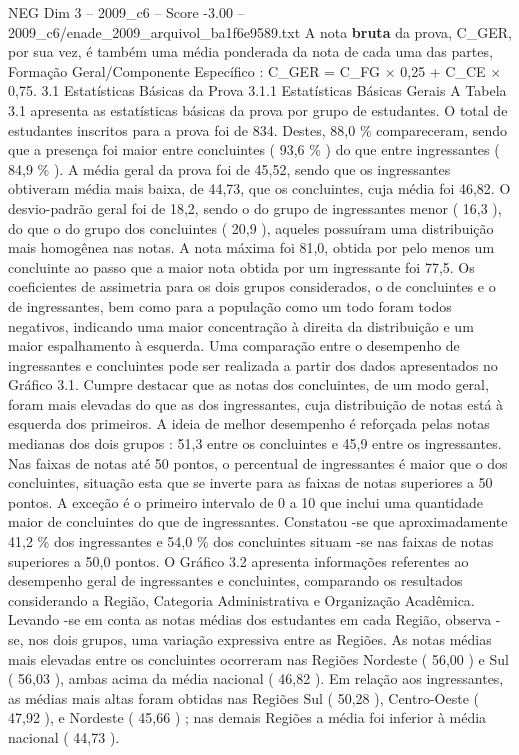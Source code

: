 \begin{textsample}{NEG Dim 3 – 2009\_c6 – Score -3.00 – 2009\_c6/enade\_2009\_arquivol\_ba1f6e9589.txt}
A nota \textbf{bruta} da prova, C\_GER, por sua vez, é também uma média ponderada da nota de cada uma das partes, Formação Geral/Componente Específico : C\_GER = C\_FG × 0,25 + C\_CE × 0,75. 3.1 Estatísticas Básicas da Prova 3.1.1 Estatísticas Básicas Gerais A Tabela 3.1 apresenta as estatísticas básicas da prova por grupo de estudantes.
O total de estudantes inscritos para a prova foi de 834.
Destes, 88,0 \% compareceram, sendo que a presença foi maior entre concluintes ( 93,6 \% ) do que entre ingressantes ( 84,9 \% ).
A média geral da prova foi de 45,52, sendo que os ingressantes obtiveram média mais baixa, de 44,73, que os concluintes, cuja média foi 46,82.
O desvio-padrão geral foi de 18,2, sendo o do grupo de ingressantes menor ( 16,3 ), do que o do grupo dos concluintes ( 20,9 ), aqueles possuíram uma distribuição mais homogênea nas notas.
A nota máxima foi 81,0, obtida por pelo menos um concluinte ao passo que a maior nota obtida por um ingressante foi 77,5.
Os coeficientes de assimetria para os dois grupos considerados, o de concluintes e o de ingressantes, bem como para a população como um todo foram todos negativos, indicando uma maior concentração à direita da distribuição e um maior espalhamento à esquerda.
Uma comparação entre o desempenho de ingressantes e concluintes pode ser realizada a partir dos dados apresentados no Gráfico 3.1.
Cumpre destacar que as notas dos concluintes, de um modo geral, foram mais elevadas do que as dos ingressantes, cuja distribuição de notas está à esquerda dos primeiros.
A ideia de melhor desempenho é reforçada pelas notas medianas dos dois grupos : 51,3 entre os concluintes e 45,9 entre os ingressantes.
Nas faixas de notas até 50 pontos, o percentual de ingressantes é maior que o dos concluintes, situação esta que se inverte para as faixas de notas superiores a 50 pontos.
A exceção é o primeiro intervalo de 0 a 10 que inclui uma quantidade maior de concluintes do que de ingressantes.
Constatou -se que aproximadamente 41,2 \% dos ingressantes e 54,0 \% dos concluintes situam -se nas faixas de notas superiores a 50,0 pontos.
O Gráfico 3.2 apresenta informações referentes ao desempenho geral de ingressantes e concluintes, comparando os resultados considerando a Região, Categoria Administrativa e Organização Acadêmica.
Levando -se em conta as notas médias dos estudantes em cada Região, observa -se, nos dois grupos, uma variação expressiva entre as Regiões.
As notas médias mais elevadas entre os concluintes ocorreram nas Regiões Nordeste ( 56,00 ) e Sul ( 56,03 ), ambas acima da média nacional ( 46,82 ).
Em relação aos ingressantes, as médias mais altas foram obtidas nas Regiões Sul ( 50,28 ), Centro-Oeste ( 47,92 ), e Nordeste ( 45,66 ) ; nas demais Regiões a média foi inferior à média nacional ( 44,73 ).

\end{textsample}
